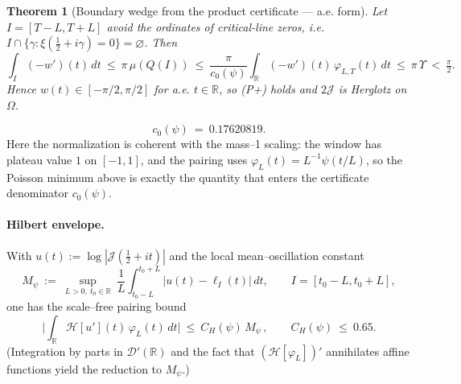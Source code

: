 \documentclass[11pt]{article}
\providecommand{\CPstar}{0.04}%
\newtheorem{theorem}{Theorem}
\theoremstyle{definition}
\theoremstyle{remark}
\newcommand{\R}{\mathbb{R}}
\begin{document}
\begin{theorem}[Boundary wedge from the product certificate — a.e. form]\label{thm:aewedge}
Let $I=[T-L,T+L]$ avoid the ordinates of critical-line zeros, i.e. $I\cap\{\gamma:\xi(\tfrac12+i\gamma)=0\}=\varnothing$. Then
\[\int_I (-w')(t)\,dt\ \le\ \pi\,\mu(Q(I))\ \le\ \frac{\pi}{c_0(\psi)}\int_{\R}(-w')(t)\,\varphi_{L,T}(t)\,dt\ \le\ \pi\,\Upsilon\ <\ \tfrac{\pi}{2}.\]
Hence $w(t)\in[-\pi/2,\pi/2]$ for a.e. $t\in\R$, so \textup{(P+)} holds and $2\mathcal J$ is Herglotz on $\Omega$.
\end{theorem}
\[
 c_0(\psi)\ =\ 0.17620819.
\]
Here the normalization is coherent with the mass--1 scaling: the window has plateau value $1$ on $[-1,1]$, and the pairing uses $\varphi_L(t)=L^{-1}\psi(t/L)$, so the Poisson minimum above is exactly the quantity that enters the certificate denominator $c_0(\psi)$.

\paragraph{Hilbert envelope.}
With $u(t):=\log|\mathcal J(\tfrac12+it)|$ and the local mean--oscillation constant
\[
 M_\psi\ :=\ \sup_{L>0,\ t_0\in\R}\ \frac{1}{L}\int_{t_0-L}^{t_0+L}\big|u(t)-\ell_{I}(t)\big|\,dt,
 \qquad I=[t_0-L,t_0+L],
\]
one has the scale--free pairing bound
\[
 \Big|\int_\R\mathcal H[u'](t)\,\varphi_L(t)\,dt\Big|\ \le\ C_H(\psi)\,M_\psi\,,\qquad C_H(\psi)\ \le\ 0.65.
\]
(Integration by parts in $\mathcal D'(\R)$ and the fact that $(\mathcal H[\varphi_L])'$ annihilates affine functions yield the reduction to $M_\psi$.)
\end{document}
